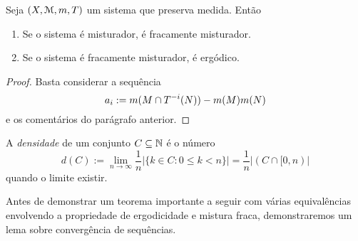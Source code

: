 \begin{proposition}
	Seja $(X,\mathcal{M},m,T)$ um sistema que preserva medida. Então
	\begin{enumerate}
	\item Se o sistema é misturador, é fracamente misturador.
	\item Se o sistema é fracamente misturador, é ergódico.
	\end{enumerate}
\end{proposition}
\begin{proof}
	Basta considerar a sequência
	\begin{equation*}
	a_i := m(M \cap T^{-i}(N)) - m(M)m(N)
	\end{equation*}
	e os comentários do parágrafo anterior.
\end{proof}

\begin{definition}
	A \emph{densidade} de um conjunto $C \subseteq \mathbb{N}$ é o número
	\begin{equation*}
	d(C) := \lim_{n \to \infty} \frac{1}{n} \left|\{k \in C: 0 \leq k < n\}\right| = \frac{1}{n} \left|(C \cap [0,n)\right|
	\end{equation*}
quando o limite existir.
\end{definition}

	Antes de demonstrar um teorema importante a seguir com várias equivalências envolvendo a propriedade de ergodicidade e mistura fraca, demonstraremos um lema sobre convergência de sequências.

